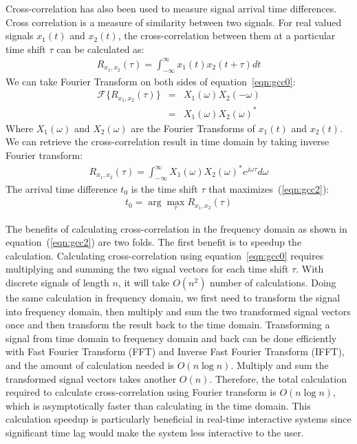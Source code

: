 Cross-correlation has also been used to measure signal arrival time differences\cite{tdoa:mit2, tdoa:micloc, tdoa:3}.  Cross correlation is a measure of similarity between two signals. For real valued signals $x_1(t)$ and $x_2(t)$, the cross-correlation between them at a particular time shift $\tau$ can be calculated as:
\begin{eqnarray}\label{eqn:gcc0}
 R_{x_1,x_2}(\tau) = \int_{-\infty}^{\infty} x_1(t) x_2(t+\tau)dt
\end{eqnarray}
We can take Fourier Transform on both sides of equation~\ref{eqn:gcc0}:
\begin{eqnarray}\label{eqn:gcc1}
\mathcal{F}\{ R_{x_1,x_2}(\tau)\} & = & X_1(\omega) X_2(-\omega)\\
& =& X_1(\omega) X_2(\omega)^*
\end{eqnarray}
Where $X_1(\omega)$ and $X_2(\omega)$ are the Fourier Transforms of $x_1(t)$ and $x_2(t)$. We can retrieve the cross-correlation result in time domain by taking inverse Fourier transform:
\begin{eqnarray}\label{eqn:gcc2}
 R_{x_1,x_2}(\tau) = \int_{-\infty}^\infty X_1(\omega)X_2(\omega)^*e^{j\omega\tau} d\omega
\end{eqnarray}
The arrival time difference $t_0$ is the time shift $\tau$ that maximizes~(\ref{eqn:gcc2}):
\begin{eqnarray}\label{eqn:gcc3}
t_0 = \arg\max_\tau R_{x_1,x_2}(\tau) 
\end{eqnarray}

The benefits of calculating cross-correlation in the frequency domain as shown in equation~(\ref{eqn:gcc2}) are two folds. The first benefit is to speedup the calculation. Calculating cross-correlation using equation~\ref{eqn:gcc0} requires multiplying and summing the two signal vectors for each time shift $\tau$. With discrete signals of length $n$, it will take $O(n^2)$ number of calculations. Doing the same calculation in frequency domain, we first need to transform the signal into frequency domain, then multiply and sum the two transformed signal vectors once and then transform the result back to the time domain. Transforming a signal from time domain to frequency domain and back can be done efficiently with Fast Fourier Transform (FFT) and Inverse Fast Fourier Transform (IFFT), and the amount of calculation needed is $O(n\log n)$. Multiply and sum the transformed signal vectors takes another $O(n)$. Therefore, the total calculation required to calculate cross-correlation using Fourier transform is $O(n\log n)$, which is asymptotically faster than calculating in the time domain. This calculation speedup is particularly beneficial in real-time interactive systems since significant time lag would make the system less interactive to the user. 

